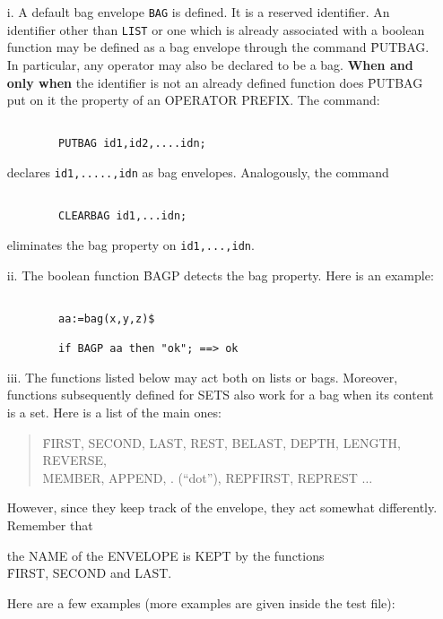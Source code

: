 \begin{itemize}
\item[i.] A default bag envelope \verb+BAG+ is defined.
It is a reserved identifier.
An identifier other than \verb+LIST+ or one which is already associated
with a boolean function may be defined as a bag envelope through the
command \f{PUTBAG}. In particular, any operator may also be declared
to be a bag. {\bf When and only when} the identifier is not an already defined
function does \f{PUTBAG} put on it the property of an OPERATOR PREFIX.
The command:
\begin{verbatim}

        PUTBAG id1,id2,....idn;

\end{verbatim}
declares \verb+id1,.....,idn+ as bag envelopes.
Analogously, the command
\begin{verbatim}

        CLEARBAG id1,...idn;

\end{verbatim}
eliminates the bag property on \verb+id1,...,idn+.
\item[ii.] The boolean function \f{BAGP} detects the bag property.
Here is an example:
\begin{verbatim}

        aa:=bag(x,y,z)$

        if BAGP aa then "ok"; ==> ok

\end{verbatim}
\item[iii.] The functions listed below may act both on lists or bags.
Moreover, functions subsequently  defined for  SETS also work for a bag
when its content is a set.
Here is a list of the main ones:

\begin{quotation}
\noindent
\f{FIRST, SECOND, LAST, REST, BELAST, DEPTH, LENGTH, REVERSE,\\
MEMBER, APPEND, . (``dot''), REPFIRST, REPREST} $\ldots$
\end{quotation}

However, since they keep track of the envelope, they act
somewhat differently. Remember that   
\vspace{5pt}
\begin{center}
the NAME of the ENVELOPE is KEPT by the functions \\[3pt]
\f{FIRST, SECOND and LAST}.
\end{center}
Here are a few examples (more examples are
given inside the test file):
\begin{verbatim}


\end{verbatim}
\end{itemize}
